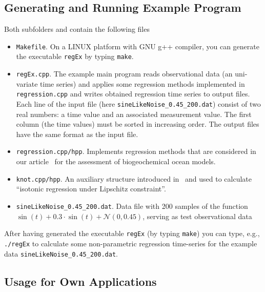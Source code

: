 \documentclass[a4paper]{article}
\begin{document}
\subsection{Generating and Running Example Program}
Both subfolders \texttt{} and \texttt{} contain the following files
\begin{itemize}
\item \texttt{Makefile}. On a LINUX platform with GNU g++ compiler,
you can generate the executable \texttt{regEx} by typing \texttt{make}.
\item \texttt{regEx.cpp}. The example main program reads
observational data (an uni-variate time series)
and applies some regression methods implemented in \texttt{regression.cpp}
and writes obtained regression time series to output files.
Each line of the input file (here \texttt{sineLikeNoise\_0.45\_200.dat})
consist of two real numbers: a time value and an associated measurement value.
The first column (the time values) must be sorted in increasing order.
The output files have the same format as the input file.
\item \texttt{regression.cpp/hpp}. Implements regression methods
that are considered in our article~\cite{SLL+17}
for the assessment of biogeochemical ocean models.
\item \texttt{knot.cpp/hpp}. An auxiliary structure
introduced in~\cite{YW09} and used to calculate
\enquote{isotonic regression under Lipschitz constraint}.
\item \texttt{sineLikeNoise\_0.45\_200.dat}. Data file with 200 samples
of the function $\sin(t)+0.3\cdot \sin(t)+\mathcal{N}(0,0.45)$,
serving as test observational data
\end{itemize}
After having generated the executable \texttt{regEx}
(by typing \texttt{make}) you can type,
e.g., \texttt{./regEx} to calculate
some non-parametric regression time-series
for the example data \texttt{sineLikeNoise\_0.45\_200.dat}.


\subsection{Usage for Own Applications}




\end{document}
